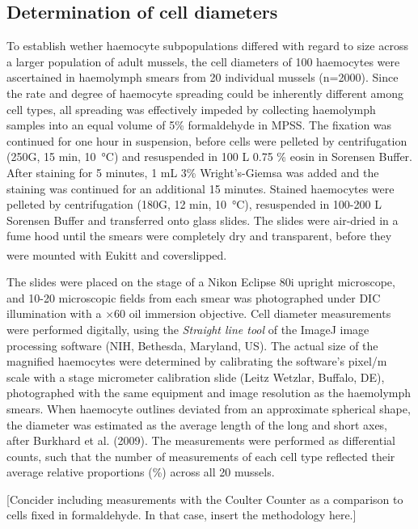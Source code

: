 \subsection{Determination of cell diameters}
\label{subsection:CytCar}
To establish wether haemocyte subpopulations differed with regard to size across a larger population of adult mussels, the cell diameters of 100 haemocytes were ascertained in haemolymph smears from 20 individual mussels (n=2000). Since the rate and degree of haemocyte spreading could be inherently different among cell types, all spreading was effectively impeded by collecting haemolymph samples into an equal volume of 5\% formaldehyde in MPSS. The fixation was continued for one hour in suspension, before cells were pelleted by centrifugation (250G, 15 min, \SI{10}{\celsius}) and resuspended in 100 \micro L 0.75 \% eosin in Sorensen Buffer. After staining for 5 minutes, 1 mL 3\% Wright’s-Giemsa was added and the staining was continued for an additional 15 minutes. Stained haemocytes were pelleted by centrifugation (180G, 12 min, \SI{10}{\celsius}), resuspended in 100-200 \micro L Sorensen Buffer and transferred onto glass slides. The slides were air-dried in a fume hood until the smears were completely dry and transparent, before they were mounted with Eukitt\textsuperscript{\textregistered} and coverslipped.

The slides were placed on the stage of a Nikon Eclipse 80i upright microscope, and 10-20 microscopic fields from each smear was photographed under DIC illumination with a $\times$60 oil immersion objective. Cell diameter measurements were performed digitally, using the \emph{Straight line tool} of the ImageJ image processing software (NIH, Bethesda, Maryland, US). The actual size of the magnified haemocytes were determined by calibrating the software's pixel/\micro m scale with a stage micrometer calibration slide (Leitz Wetzlar, Buffalo, DE), photographed with the same equipment and image resolution as the haemolymph smears. When haemocyte outlines deviated from an approximate spherical shape, the diameter was estimated as the average length of the long and short axes, after Burkhard et al. (2009). The measurements were performed as differential counts, such that the number of measurements of each cell type reflected their average relative proportions (\%) across all 20 mussels.

[Concider including measurements with the Coulter Counter as a comparison to cells fixed in formaldehyde. In that case, insert the methodology here.]

